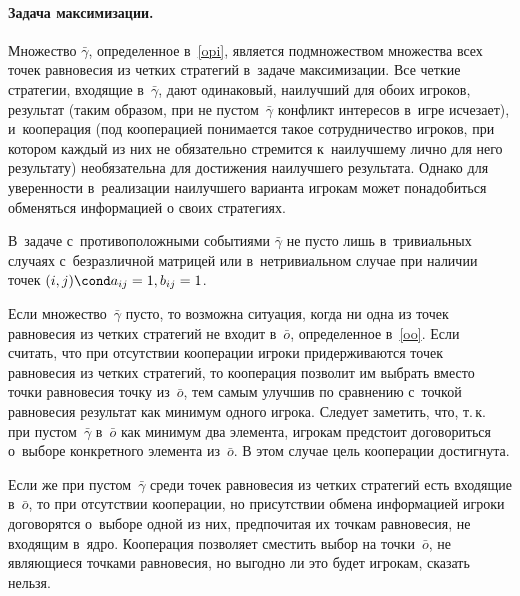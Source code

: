 \documentclass[twoside]{article}
\begin{document}
\paragraph{Задача максимизации.}
\begin{Theorem}
Множество $\bar\gamma${\rm,} определенное в~\eqref{opi}{\rm,} является подмножеством множества всех
точек равновесия из четких стратегий в~задаче максимизации. Все четкие стратегии, входящие
в~$\bar\gamma${\rm,} дают одинаковый{\rm,} наилучший для обоих игроков{\rm,} результат (таким
образом{\rm,} при не пустом~$\bar\gamma$ конфликт интересов в~игре исчезает), и~кооперация (под
кооперацией понимается такое сотрудничество игроков, при котором каждый из них не обязательно
стремится к~наилучшему лично для него результату) необязательна для достижения наилучшего
результата. Однако для уверенности в~реализации наилучшего варианта игрокам может понадобиться
обменяться информацией о своих стратегиях.

В~задаче с~противоположными событиями $\bar\gamma$ не пусто лишь в~тривиальных случаях
с~безразличной матрицей или в~нетривиальном случае при наличии точек $(i,j)\cond
a_{ij}=1,b_{ij}=1$.

Если множество~$\bar\gamma$ пусто{\rm,} то возможна ситуация{\rm,} когда ни одна из точек
равновесия из четких стратегий не входит в~$\bar o${\rm,} определенное в~\eqref{oo}. Если
считать{\rm,} что при отсутствии кооперации игроки придерживаются точек равновесия из четких
стратегий{\rm,} то кооперация позволит им выбрать вместо точки равновесия точку из~$\bar o${\rm,}
тем самым улучшив по сравнению с~точкой равновесия результат как минимум одного игрока. Следует
заметить{\rm,} что{\rm,} т.\,к. при пустом~$\bar\gamma$ в~$\bar o$ как минимум два элемента{\rm,}
игрокам предстоит договориться о~выборе конкретного элемента из~$\bar o$. В этом случае цель
кооперации достигнута.


Если же при пустом~$\bar\gamma$ среди точек равновесия из четких стратегий есть входящие в~$\bar
o${\rm,} то при отсутствии кооперации{\rm,} но присутствии обмена информацией игроки договорятся
о~выборе одной из них{\rm,} предпочитая их точкам равновесия{\rm,} не входящим в~ядро. Кооперация
позволяет сместить выбор на точки~$\bar o${\rm,} не являющиеся точками равновесия{\rm,} но выгодно
ли это будет игрокам{\rm,} сказать нельзя.
\end{Theorem}
\end{document}

